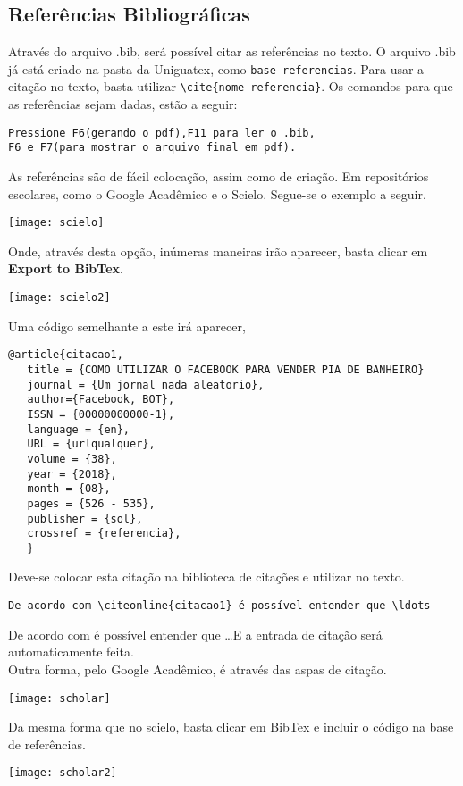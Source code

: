 \subsection{Referências Bibliográficas}
\label{referenciasbiblio}
Através do arquivo .bib, será possível citar as referências no texto.
O arquivo .bib já está criado na pasta da Uniguatex, como \verb|base-referencias|.
Para usar a citação no texto, basta utilizar \verb|\cite{nome-referencia}|.
Os comandos para que as referências sejam dadas, estão a seguir:
\begin{verbatim}
Pressione F6(gerando o pdf),F11 para ler o .bib, 
F6 e F7(para mostrar o arquivo final em pdf).
\end{verbatim}
As referências são de fácil colocação, assim como de criação. Em repositórios escolares, como o Google Acadêmico e o Scielo. Segue-se o exemplo a seguir.
\begin{center}
\texttt{[image: scielo]}
\end{center}
Onde, através desta opção, inúmeras maneiras irão aparecer, basta clicar em \textbf{Export to BibTex}.
\begin{center}
\texttt{[image: scielo2]}
\end{center}
Uma código semelhante a este irá aparecer,
\begin{verbatim}
@article{citacao1,
   title = {COMO UTILIZAR O FACEBOOK PARA VENDER PIA DE BANHEIRO}
   journal = {Um jornal nada aleatorio},
   author={Facebook, BOT},
   ISSN = {00000000000-1},
   language = {en},
   URL = {urlqualquer},
   volume = {38},
   year = {2018},
   month = {08},
   pages = {526 - 535},
   publisher = {sol},
   crossref = {referencia},
   }
\end{verbatim}
Deve-se colocar esta citação na biblioteca de citações e utilizar no texto.
\begin{verbatim}
De acordo com \citeonline{citacao1} é possível entender que \ldots
\end{verbatim}
De acordo com  é possível entender que \ldots E a entrada de citação será automaticamente feita.\\
Outra forma, pelo Google Acadêmico, é através das aspas de citação.
\begin{center}
\texttt{[image: scholar]}
\end{center}
Da mesma forma que no scielo, basta clicar em BibTex e incluir o código na base de referências.
\begin{center}
\texttt{[image: scholar2]}
\end{center}
